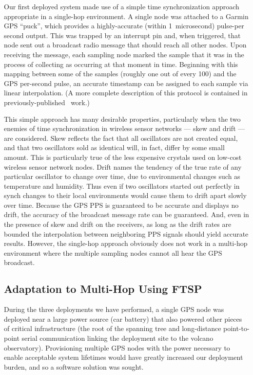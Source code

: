 Our first deployed system made use of a simple time synchronization approach
appropriate in a single-hop environment.  A single node was attached to a
Garmin GPS ``puck'', which provides a highly-accurate (within 1~microsecond)
pulse-per second output. This was trapped by an interrupt pin and, when
triggered, that node sent out a broadcast radio message that should reach all
other nodes. Upon receiving the message, each sampling node marked the sample
that it was in the process of collecting as occurring at that moment in time.
Beginning with this mapping between some of the samples (roughly one out of
every 100) and the GPS per-second pulse, an accurate timestamp can be
assigned to each sample via linear interpolation. (A more complete
description of this protocol is contained in
previously-published~\cite{volcano-ewsn05} work.)

This simple approach has many desirable properties, particularly when the two
enemies of time synchronization in wireless sensor networks --- skew and
drift --- are considered. Skew reflects the fact that all oscillators are not
created equal, and that two oscillators sold as identical will, in fact,
differ by some small amount. This is particularly true of the less expensive
crystals used on low-cost wireless sensor network nodes. Drift names the
tendency of the true rate of any particular oscillator to change over time,
due to environmental changes such as temperature and humidity.  Thus even if
two oscillators started out perfectly in synch changes to their local
environments would cause them to drift apart slowly over time. Because the
GPS PPS is guaranteed to be accurate and displays no drift, the accuracy of
the broadcast message rate can be guaranteed. And, even in the presence of
skew and drift on the receivers, as long as the drift rates are bounded the
interpolation between neighboring PPS signals should yield accurate results.
However, the single-hop approach obviously does not work in a multi-hop
environment where the multiple sampling nodes cannot all hear the GPS
broadcast.

\subsection{Adaptation to Multi-Hop Using FTSP}

During the three deployments we have performed, a single GPS node was
deployed near a large power source (car battery) that also powered other
pieces of critical infrastructure (the root of the spanning tree and
long-distance point-to-point serial communication linking the deployment site
to the volcano observatory).  Provisioning multiple GPS nodes with the power
necessary to enable acceptable system lifetimes would have greatly
increased our deployment burden, and so a software solution was sought.

